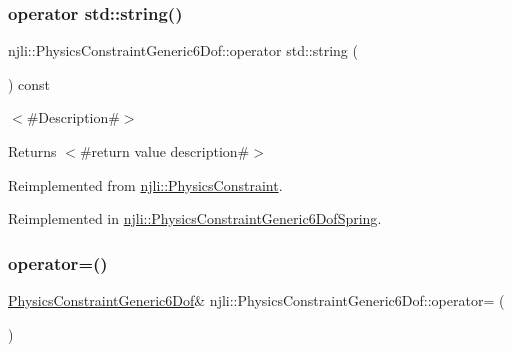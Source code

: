 \subsubsection{\texorpdfstring{operator std\+::string()}{operator std::string()}}
{\footnotesize\ttfamily njli\+::\+Physics\+Constraint\+Generic6\+Dof\+::operator std\+::string (\begin{DoxyParamCaption}{ }\end{DoxyParamCaption}) const\hspace{0.3cm}{\ttfamily [virtual]}}

$<$\#\+Description\#$>$

\begin{DoxyReturn}{Returns}
$<$\#return value description\#$>$ 
\end{DoxyReturn}


Reimplemented from \mbox{\hyperlink{classnjli_1_1_physics_constraint_a4cb967ebae1b139bc7511bc9fcc074c5}{njli\+::\+Physics\+Constraint}}.



Reimplemented in \mbox{\hyperlink{classnjli_1_1_physics_constraint_generic6_dof_spring_a5ac3c1339170b7f94c3cb32cdd1d33ca}{njli\+::\+Physics\+Constraint\+Generic6\+Dof\+Spring}}.

\mbox{\label{classnjli_1_1_physics_constraint_generic6_dof_ac42ed9d463f637ef98b2b45112d967aa}} 
\subsubsection{\texorpdfstring{operator=()}{operator=()}}
{\footnotesize\ttfamily \mbox{\hyperlink{classnjli_1_1_physics_constraint_generic6_dof}{Physics\+Constraint\+Generic6\+Dof}}\& njli\+::\+Physics\+Constraint\+Generic6\+Dof\+::operator= (\begin{DoxyParamCaption}\item[{const \mbox{\hyperlink{classnjli_1_1_physics_constraint_generic6_dof}{Physics\+Constraint\+Generic6\+Dof}} \&}]{ }\end{DoxyParamCaption})\hspace{0.3cm}{\ttfamily [protected]}}

\mbox{\label{classnjli_1_1_physics_constraint_generic6_dof_ac57766961297ad087fb0ee7dc26e17d8}} 

